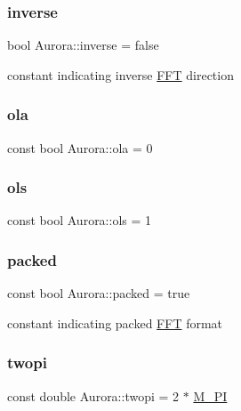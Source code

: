\subsubsection{\texorpdfstring{inverse}{inverse}}
{\footnotesize\ttfamily bool Aurora\+::inverse = false\hspace{0.3cm}{\ttfamily [static]}}

constant indicating inverse \hyperlink{class_aurora_1_1_f_f_t}{F\+FT} direction \mbox{\label{namespace_aurora_ab2cb0b1f6952bb2ca908ebd8156370db}} 
\subsubsection{\texorpdfstring{ola}{ola}}
{\footnotesize\ttfamily const bool Aurora\+::ola = 0}

\mbox{\label{namespace_aurora_a4e816792565225ccd6ba67110f75fb8b}} 
\subsubsection{\texorpdfstring{ols}{ols}}
{\footnotesize\ttfamily const bool Aurora\+::ols = 1}

\mbox{\label{namespace_aurora_a3e70ffc9ea5c526dcd66b1b14e43f175}} 
\subsubsection{\texorpdfstring{packed}{packed}}
{\footnotesize\ttfamily const bool Aurora\+::packed = true}

constant indicating packed \hyperlink{class_aurora_1_1_f_f_t}{F\+FT} format \mbox{\label{namespace_aurora_a4c08f8416c2b35d5001062f121459b5a}} 
\subsubsection{\texorpdfstring{twopi}{twopi}}
{\footnotesize\ttfamily const double Aurora\+::twopi = 2 $\ast$ \hyperlink{_snd_base_8h_ae71449b1cc6e6250b91f539153a7a0d3}{M\+\_\+\+PI}}

